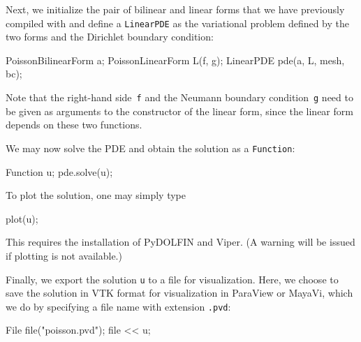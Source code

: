 Next, we initialize the pair of bilinear and linear forms that we have
previously compiled with \ffc{} and define a \texttt{LinearPDE} as the
variational problem defined by the two forms and the Dirichlet
boundary condition:
\begin{code}
PoissonBilinearForm a;
PoissonLinearForm L(f, g);
LinearPDE pde(a, L, mesh, bc);
\end{code}
Note that the right-hand side~\texttt{f} and the Neumann boundary
condition~\texttt{g} need to be given as arguments to the constructor
of the linear form, since the linear form depends on these two
functions.

We may now solve the PDE and obtain the solution as a \texttt{Function}:
\begin{code}
Function u;
pde.solve(u);
\end{code}

To plot the solution, one may simply type
\begin{code}
plot(u);
\end{code}
This requires the installation of PyDOLFIN and Viper. (A warning will
be issued if plotting is not available.)

Finally, we export the solution \texttt{u} to a file for
visualization. Here, we choose to save the solution in VTK format for
visualization in ParaView or MayaVi, which we do by specifying a file
name with extension \texttt{.pvd}:
\begin{code}
File file("poisson.pvd");
file << u;
\end{code}

